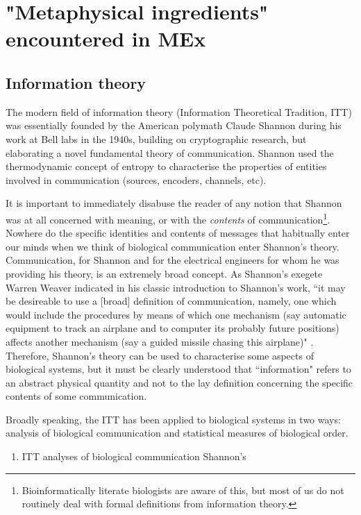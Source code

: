 \section{"Metaphysical ingredients" encountered in MEx}
\subsection{Information theory}
\label{ITT}
The modern field of information theory (Information Theoretical Tradition, ITT) was essentially founded by the American polymath Claude Shannon during his work at Bell labs in the 1940s, building on cryptographic research, but elaborating a novel  fundamental theory of communication. Shannon used the thermodynamic concept of entropy to characterise the properties of entities involved in communication (sources, encoders, channels, etc).

It is important to immediately disabuse the reader of any notion that Shannon was at all concerned with meaning, or with the \textit{contents} of communication\footnote{Bioinformatically literate biologists are aware of this, but most of us do not routinely deal with formal definitions from information theory.}. Nowhere do the specific identities and contents of messages that habitually enter our minds when we think of biological communication enter Shannon's theory. Communication, for Shannon and for the electrical engineers for whom he was providing his theory, is an extremely broad concept. As Shannon's exegete Warren Weaver indicated in his classic introduction to Shannon's work, ``it may be desireable to use a [broad] definition of communication, namely, one which would include the procedures by means of which one mechanism (say automatic equipment to track an airplane and to computer its probably future positions) affects another mechanism (say a guided missile chasing this airplane)" \cite[p.10]{Shannon1963}. Therefore, Shannon's theory can be used to characterise some aspects of biological systems, but it must be clearly understood that ``information" refers to an abstract physical quantity and not to the lay definition concerning the specific contents of some communication.

Broadly speaking, the ITT has been applied to biological systems in two ways: analysis of biological communication and statistical measures of biological order.

\begin{enumerate}
\item{ITT analyses of biological communication} Shannon's 
\end{enumerate}

